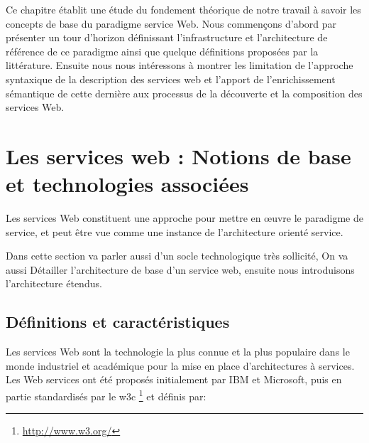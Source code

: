 

    Ce chapitre établit une étude du fondement théorique de notre travail à savoir les concepts de base du paradigme
    service Web.  Nous commençons d'abord par présenter un tour d'horizon définissant l'infrastructure et
    l'architecture de référence de ce paradigme ainsi que quelque définitions proposées par la littérature. Ensuite
    nous nous intéressons à montrer les limitation de l'approche syntaxique de la description des services web et l'apport
    de l'enrichissement sémantique de cette dernière aux processus de la découverte et la composition des services Web.\\

\section{Les services web : Notions de base et technologies associées} 
    Les services Web constituent une approche pour mettre en œuvre le paradigme de service, et peut être vue comme
    une instance de l'architecture orienté service.

    Dans cette section va parler aussi d'un socle technologique très sollicité, On va aussi Détailler l'architecture de base 
    d'un service web, ensuite nous introduisons l'architecture étendus.

    \subsection{Définitions et caractéristiques } 
	Les services Web sont la technologie la plus connue et la plus populaire dans le monde industriel et
	académique pour la mise en place d’architectures à services. 
	Les Web services ont été proposés initialement par IBM \cite{kreger2001web} et Microsoft, puis en partie 
	standardisés par le \acrshort{w3c} \footnote{\url{http://www.w3.org/}} et définis \cite{WSA} par:\\

